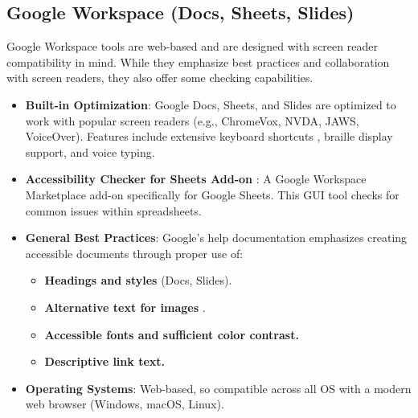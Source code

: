 \subsection{Google Workspace (Docs, Sheets, Slides)}
\label{subsec:google-workspace}
Google Workspace tools are web-based and are designed with screen reader compatibility in mind. While they emphasize best practices and collaboration with screen readers, they also offer some checking capabilities.
\begin{itemize}
    \item \textbf{Built-in Optimization}: Google Docs, Sheets, and Slides are optimized to work with popular screen readers (e.g., ChromeVox, NVDA, JAWS, VoiceOver). Features include extensive keyboard shortcuts \cite{gdocskeyshortcuts}, braille display support, and voice typing.

    \item \textbf{Accessibility Checker for Sheets Add-on} \cite{gsheetsaccessibilitychecker}: A Google Workspace Marketplace add-on specifically for Google Sheets. This GUI tool checks for common issues within spreadsheets.

    \item \textbf{General Best Practices}: Google's help documentation emphasizes creating accessible documents through proper use of:

        \begin{itemize}
            \item \textbf{Headings and styles} (Docs, Slides).
            \item \textbf{Alternative text for images} \cite{gdocsalttext}.
            \item \textbf{Accessible fonts and sufficient color contrast.}
            \item \textbf{Descriptive link text.}
        \end{itemize}

    \item \textbf{Operating Systems}: Web-based, so compatible across all OS with a modern web browser (Windows, macOS, Linux).

\end{itemize}

